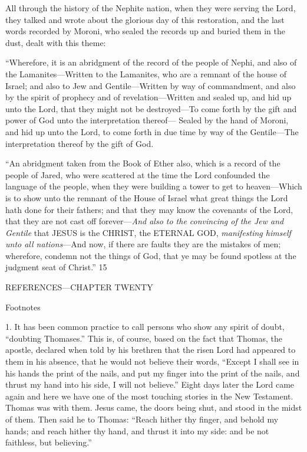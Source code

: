 All through the history of the Nephite nation, when they were serving the Lord, they talked
and wrote about the glorious day of this restoration, and the last words recorded by Moroni,
who sealed the records up and buried them in the dust, dealt with this theme:

``Wherefore, it is an abridgment of the record of the people of Nephi, and also of the
Lamanites—Written to the Lamanites, who are a remnant of the house of Israel; and also to
Jew and Gentile—Written by way of commandment, and also by the spirit of prophecy and
of revelation—Written and sealed up, and hid up unto the Lord, that they might not be
destroyed—To come forth by the gift and power of God unto the interpretation thereof—
Sealed by the hand of Moroni, and hid up unto the Lord, to come forth in due time by way of
the Gentile—The interpretation thereof by the gift of God.

``An abridgment taken from the Book of Ether also, which is a record of the people of Jared,
who were scattered at the time the Lord confounded the language of the people, when they
were building a tower to get to heaven—Which is to show unto the remnant of the House of
Israel what great things the Lord hath done for their fathers; and that they may know the
covenants of the Lord, that they are not cast off forever—\textit{And also to the convincing of the
Jew and Gentile} that JESUS is the CHRIST, the ETERNAL GOD, \textit{manifesting himself unto
all nations}—And now, if there are faults they are the mistakes of men; wherefore, condemn
not the things of God, that ye may be found spotless at the judgment seat of Christ.'' 15

\newpage
REFERENCES—CHAPTER TWENTY

Footnotes

1. It has been common practice to call persons who show any spirit of doubt, ``doubting
Thomases.'' This is, of course, based on the fact that Thomas, the apostle, declared when told
by his brethren that the risen Lord had appeared to them in his absence, that he would not
believe their words, ``Except I shall see in his hands the print of the nails, and put my finger
into the print of the nails, and thrust my hand into his side, I will not believe.'' Eight days
later the Lord came again and here we have one of the most touching stories in the New
Testament. Thomas was with them. Jesus came, the doors being shut, and stood in the midst
of them. Then said he to Thomas: ``Reach hither thy finger, and behold my hands; and reach
hither thy hand, and thrust it into my side: and be not faithless, but believing.''

